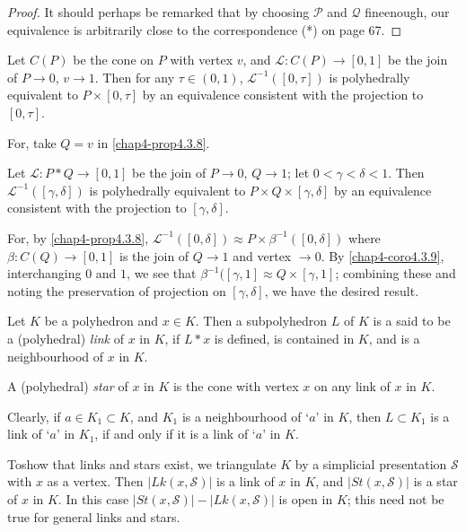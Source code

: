 \begin{proof}
It should perhaps be remarked that by choosing $\mathscr{P}$ and $\mathcal{Q}$ fine\pageoriginale\break enough, our equivalence is arbitrarily close to the correspondence (*) on page 67.
\end{proof}

\begin{corollary}\label{chap4-coro4.3.9}
Let $C(P)$ be the cone on $P$ with vertex $v$, and $\mathcal{L}:C(P)\to [0,1]$ be the join of $P\to 0$, $v\to 1$. Then for any $\tau\in (0,1)$, $\mathcal{L}^{-1}([0,\tau])$ is polyhedrally equivalent to $P\times [0,\tau]$ by an equivalence consistent with the projection to $[0,\tau]$.  

For, take $Q=v$ in \ref{chap4-prop4.3.8}.
\end{corollary}

\begin{corollary}\label{chap4-coro4.3.10}
Let $\mathcal{L}:P\ast Q\to [0,1]$ be the join of $P\to 0$, $Q\to 1$; let $0<\gamma<\delta< 1$. Then $\mathcal{L}^{-1}([\gamma,\delta])$ is polyhedrally equivalent to $P\times Q\times[\gamma,\delta]$ by an equivalence consistent with the projection to $[\gamma,\delta]$.

For, by \ref{chap4-prop4.3.8}, $\mathcal{L}^{-1}([0,\delta])\approx P\times \beta^{-1}([0,\delta])$ where $\beta:C(Q)\to [0,1]$ is the join of $Q\to 1$ and vertex $\to 0$. By \ref{chap4-coro4.3.9}, interchanging $0$ and $1$, we see that $\beta^{-1}([\gamma,1]\approx Q\times [\gamma,1]$; combining these and noting the preservation of projection on $[\gamma,\delta]$, we have the desired result.
\end{corollary}

\begin{definition}\label{chap4-defi4.3.11}
Let $K$ be a polyhedron and $x\in K$. Then a subpolyhedron $L$ of $K$ is a said to be a (polyhedral) {\em link} of $x$ in $K$, if $L\ast x$ is defined, is contained in $K$, and is a neighbourhood of $x$ in $K$.
\end{definition}

A (polyhedral) {\em star} of $x$ in $K$ is the cone with vertex $x$ on any link of $x$ in $K$.

Clearly, if $a\in K_{1}\subset K$, and $K_{1}$ is a neighbourhood of `$a$' in $K$, then $L\subset K_{1}$ is a link of `$a$' in $K_{1}$, if and only if it is a link of `$a$' in $K$.

To\pageoriginale show that links and stars exist, we triangulate $K$ by a simplicial presentation $\mathscr{S}$ with $x$ as a vertex. Then $|Lk(x,\mathscr{S})|$ is a link of $x$ in $K$, and $|St(x,\mathscr{S})|$ is a star of $x$ in $K$. In this case $|St(x,\mathscr{S})|-|Lk(x,\mathscr{S})|$ is open in $K$; this need not be true for general links and stars.

